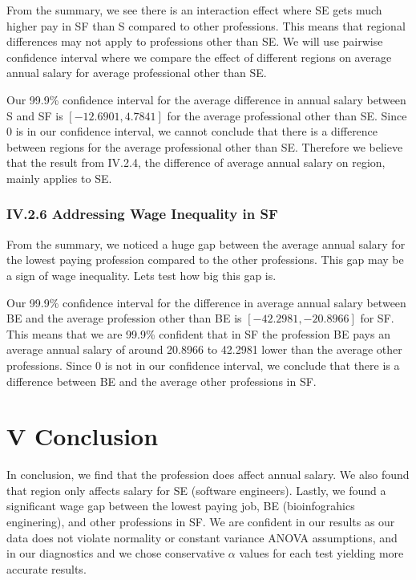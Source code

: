 \documentclass[
]{article}
\begin{document}
From the summary, we see there is an interaction effect where SE gets
much higher pay in SF than S compared to other professions. This means
that regional differences may not apply to professions other than SE. We
will use pairwise confidence interval where we compare the effect of
different regions on average annual salary for average professional
other than SE.

Our 99.9\% confidence interval for the average difference in annual
salary between S and SF is \([-12.6901, 4.7841]\) for the average
professional other than SE. Since 0 is in our confidence interval, we
cannot conclude that there is a difference between regions for the
average professional other than SE. Therefore we believe that the result
from IV.2.4, the difference of average annual salary on region, mainly
applies to SE.

\subsubsection{IV.2.6 Addressing Wage Inequality in
SF}\label{iv.2.6-addressing-wage-inequality-in-sf}

From the summary, we noticed a huge gap between the average annual
salary for the lowest paying profession compared to the other
professions. This gap may be a sign of wage inequality. Lets test how
big this gap is.

Our 99.9\% confidence interval for the difference in average annual
salary between BE and the average profession other than BE is
\([-42.2981, -20.8966]\) for SF. This means that we are 99.9\% confident
that in SF the profession BE pays an average annual salary of around
20.8966 to 42.2981 lower than the average other professions. Since 0 is
not in our confidence interval, we conclude that there is a difference
between BE and the average other professions in SF.

\section{V Conclusion}\label{v-conclusion}

In conclusion, we find that the profession does affect annual salary. We
also found that region only affects salary for SE (software engineers).
Lastly, we found a significant wage gap between the lowest paying job,
BE (bioinfograhics enginering), and other professions in SF. We are
confident in our results as our data does not violate normality or
constant variance ANOVA assumptions, and in our diagnostics and we chose
conservative \(\alpha\) values for each test yielding more accurate
results.
\end{document}

